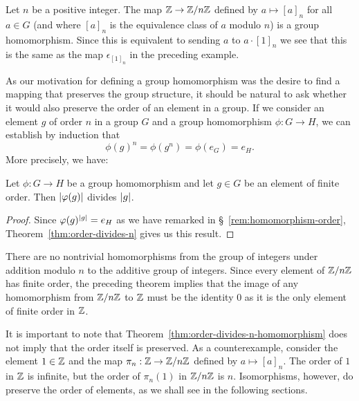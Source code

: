 \begin{example}
    Let \(n\) be a positive integer. The map \(\mathbb{Z} \to \mathbb{Z}/n\mathbb{Z}\) defined by \(a \mapsto [a]_n\) for all \(a \in G\) (and where \([a]_n\) is the equivalence class of \(a\) modulo \(n\)) is a group homomorphism. Since this is equivalent to sending \(a\) to \(a \cdot [1]_n\) we see that this is the same as the map \(\epsilon_{[1]_n}\) in the preceding example.
\end{example}

\begin{remark}
    \label{rem:homomorphism-order}
    As our motivation for defining a group homomorphism was the desire to find a mapping that preserves the group structure, it should be natural to ask whether it would also preserve the order of an element in a group. If we consider an element \(g\) of order \(n\) in a group \(G\) and a group homomorphism \(\phi: G \to H\), we can establish by induction that
    \[
        \phi(g)^n = \phi(g^n) = \phi(e_G) = e_H.
    \]
    More precisely, we have:
\end{remark}

\begin{theorem}
    \label{thm:order-divides-n-homomorphism}
    Let \(\phi: G \to H\) be a group homomorphism and let \(g \in G\) be an element of finite order. Then \(\lvert \varphi(g) \rvert\) divides \(\lvert g \rvert\).
\end{theorem}

\begin{proof}
    Since \(\varphi(g)^{\lvert g \rvert} = e_H\) as we have remarked in \S~\ref{rem:homomorphism-order}, Theorem~\ref{thm:order-divides-n} gives us this result.
\end{proof}

\begin{example}
    There are no nontrivial homomorphisms from the group of integers under addition modulo \(n\) to the additive group of integers. Since every element of \(\mathbb{Z}/n\mathbb{Z}\) has finite order, the preceding theorem implies that the image of any homomorphism from \(\mathbb{Z}/n\mathbb{Z}\) to \(\mathbb{Z}\) must be the identity \(0\) as it is the only element of finite order in \(\mathbb{Z}\).
\end{example}

\begin{example}
    It is important to note that Theorem~\ref{thm:order-divides-n-homomorphism} does not imply that the order itself is preserved. As a counterexample, consider the element \(1 \in \mathbb{Z}\) and the map \(\pi_n : \mathbb{Z} \to \mathbb{Z}/n\mathbb{Z}\) defined by \(a \mapsto [a]_n\). The order of \(1\) in \(\mathbb{Z}\) is infinite, but the order of \(\pi_n(1)\) in \(\mathbb{Z}/n\mathbb{Z}\) is \(n\). Isomorphisms, however, do preserve the order of elements, as we shall see in the following sections.
\end{example}

